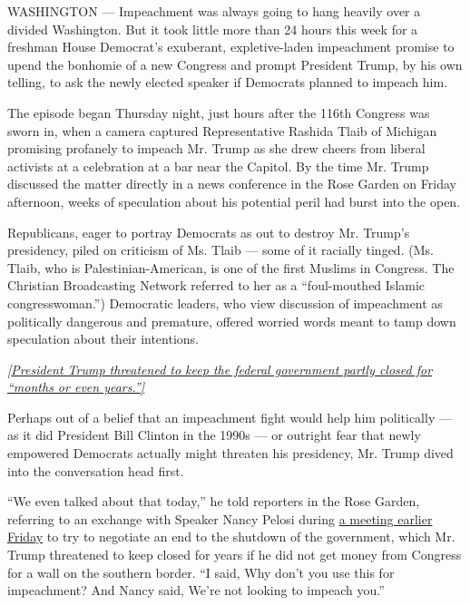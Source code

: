 WASHINGTON --- Impeachment was always going to hang heavily over a
divided Washington. But it took little more than 24 hours this week for
a freshman House Democrat's exuberant, expletive-laden impeachment
promise to upend the bonhomie of a new Congress and prompt President
Trump, by his own telling, to ask the newly elected speaker if Democrats
planned to impeach him.

The episode began Thursday night, just hours after the 116th Congress
was sworn in, when a camera captured Representative Rashida Tlaib of
Michigan promising profanely to impeach Mr. Trump as she drew cheers
from liberal activists at a celebration at a bar near the Capitol. By
the time Mr. Trump discussed the matter directly in a news conference in
the Rose Garden on Friday afternoon, weeks of speculation about his
potential peril had burst into the open.

Republicans, eager to portray Democrats as out to destroy Mr. Trump's
presidency, piled on criticism of Ms. Tlaib --- some of it racially
tinged. (Ms. Tlaib, who is Palestinian-American, is one of the first
Muslims in Congress. The Christian Broadcasting Network referred to her
as a ``foul-mouthed Islamic congresswoman.'') Democratic leaders, who
view discussion of impeachment as politically dangerous and premature,
offered worried words meant to tamp down speculation about their
intentions.

\href{https://www.nytimes3xbfgragh.onion/2019/01/04/us/politics/democrats-trump-meeting-government-shutdown.html?action=click\&module=Top\%20Stories\&pgtype=Homepage}{\emph{{[}President
Trump threatened to keep the federal government partly closed for
``months or even years.''{]}}}

Perhaps out of a belief that an impeachment fight would help him
politically --- as it did President Bill Clinton in the 1990s --- or
outright fear that newly empowered Democrats actually might threaten his
presidency, Mr. Trump dived into the conversation head first.

``We even talked about that today,'' he told reporters in the Rose
Garden, referring to an exchange with Speaker Nancy Pelosi during
\href{https://www.nytimes3xbfgragh.onion/2019/01/04/us/politics/democrats-trump-meeting-government-shutdown.html}{a
meeting earlier Friday} to try to negotiate an end to the shutdown of
the government, which Mr. Trump threatened to keep closed for years if
he did not get money from Congress for a wall on the southern border.
``I said, Why don't you use this for impeachment? And Nancy said, We're
not looking to impeach you.''

